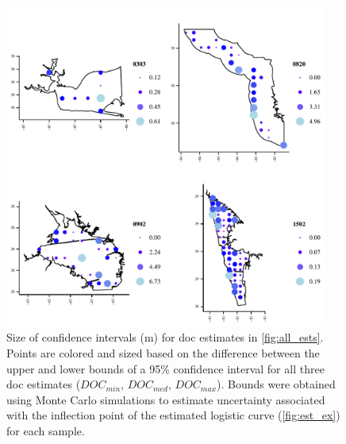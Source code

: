 \documentclass[letterpaper,12pt,oneside]{article}\usepackage[]{graphicx}\usepackage[]{color}
\begin{document}
\begin{figure}
\centering
\includegraphics[width = 0.95\textwidth]{figs/all_sens.pdf}
\caption{Size of confidence intervals (m) for \acl{doc} estimates in \cref{fig:all_ests}.  Points are colored and sized based on the difference between the upper and lower bounds of a 95\% confidence interval for all three \ac{doc} estimates ($DOC_{min}$, $DOC_{med}$, $DOC_{max}$). Bounds were obtained using Monte Carlo simulations to estimate uncertainty associated with the inflection point of the estimated logistic curve (\cref{fig:est_ex}) for each sample.}
\label{fig:all_sens}
\end{figure}

\end{document}
